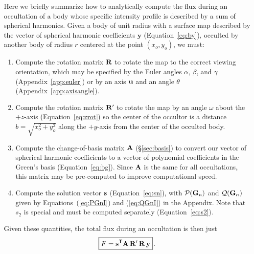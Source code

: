 \documentclass[modern]{aastex61}
\begin{document}
Here we briefly summarize how to analytically compute the flux during
an occultation of a body whose specific intensity profile is described
by a sum of spherical harmonics. Given a body of unit radius with a
surface map described by the vector of spherical harmonic coefficients
$\mathbf{y}$ (Equation~\ref{eq:by}), occulted by another body of radius $r$
centered at the point $(x_o, y_o)$, we must:
%
\begin{enumerate}
    \item Compute the rotation matrix ${\mathbf{R}}$ to rotate the map to the correct
          viewing orientation, which may be
          specified by the Euler angles $\alpha$, $\beta$, and $\gamma$
          (Appendix~\ref{app:euler}) or by an axis ${\mathbf{u}}$ and an angle $\theta$
          (Appendix~\ref{app:axisangle}).
    \item Compute the rotation matrix ${\mathbf{R'}}$ to rotate the map
          by an angle $\omega$ about the $+z$-axis
          (Equation~\ref{eq:zrot}) so the center of the occultor is a
          distance $b = \sqrt{x_o^2 + y_o^2}$ along the $+y$-axis
          from the center of the occulted body.
    \item Compute the change-of-basis matrix ${\mathbf{A}}$ (\S\ref{sec:basis}) to
          convert our vector of spherical harmonic coefficients to a vector
          of polynomial coefficients in the Green's basis
          (Equation~\ref{eq:bg}). Since ${\mathbf{A}}$ is the same for all
          occultations, this matrix may be pre-computed to improve
          computational speed.
    \item Compute the solution vector ${\mathbf{s}}$ (Equation~\ref{eq:sn}), with
          $\mathcal{P}({\mathbf{G}}_n)$ and $\mathcal{Q}({\mathbf{G}}_n)$ given by
          Equations~(\ref{eq:PGnI}) and (\ref{eq:QGnI}) in the Appendix.
          Note that $s_2$ is special and must be computed separately
          (Equation~\ref{eq:s2}).
\end{enumerate}
%
Given these quantities, the total flux during an occultation is then just
%
\begin{equation}
    \label{eq:starry}
    \boxed{
        F = \bvec{s}^{\boldsymbol{\mathsf{T}}} \bvec{A} \, \bvec{R'} \, \bvec{R} \, \bvec{y}
        }
    \quad.
\end{equation}   %


\end{document}
